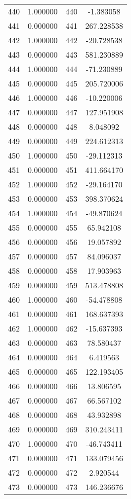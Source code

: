 \documentclass[12pt]{article}
\begin{document}
\begin{longtable}{@{}cccc@{}}
440 & 1.000000 & 440 & -1.383058 \\
441 & 0.000000 & 441 & 267.228538 \\
442 & 1.000000 & 442 & -20.728538 \\
443 & 0.000000 & 443 & 581.230889 \\
444 & 1.000000 & 444 & -71.230889 \\
445 & 0.000000 & 445 & 205.720006 \\
446 & 1.000000 & 446 & -10.220006 \\
447 & 0.000000 & 447 & 127.951908 \\
448 & 0.000000 & 448 & 8.048092 \\
449 & 0.000000 & 449 & 224.612313 \\
450 & 1.000000 & 450 & -29.112313 \\
451 & 0.000000 & 451 & 411.664170 \\
452 & 1.000000 & 452 & -29.164170 \\
453 & 0.000000 & 453 & 398.370624 \\
454 & 1.000000 & 454 & -49.870624 \\
455 & 0.000000 & 455 & 65.942108 \\
456 & 0.000000 & 456 & 19.057892 \\
457 & 0.000000 & 457 & 84.096037 \\
458 & 0.000000 & 458 & 17.903963 \\
459 & 0.000000 & 459 & 513.478808 \\
460 & 1.000000 & 460 & -54.478808 \\
461 & 0.000000 & 461 & 168.637393 \\
462 & 1.000000 & 462 & -15.637393 \\
463 & 0.000000 & 463 & 78.580437 \\
464 & 0.000000 & 464 & 6.419563 \\
465 & 0.000000 & 465 & 122.193405 \\
466 & 0.000000 & 466 & 13.806595 \\
467 & 0.000000 & 467 & 66.567102 \\
468 & 0.000000 & 468 & 43.932898 \\
469 & 0.000000 & 469 & 310.243411 \\
470 & 1.000000 & 470 & -46.743411 \\
471 & 0.000000 & 471 & 133.079456 \\
472 & 0.000000 & 472 & 2.920544 \\
473 & 0.000000 & 473 & 146.236676 \\

\end{longtable}
\end{document}
